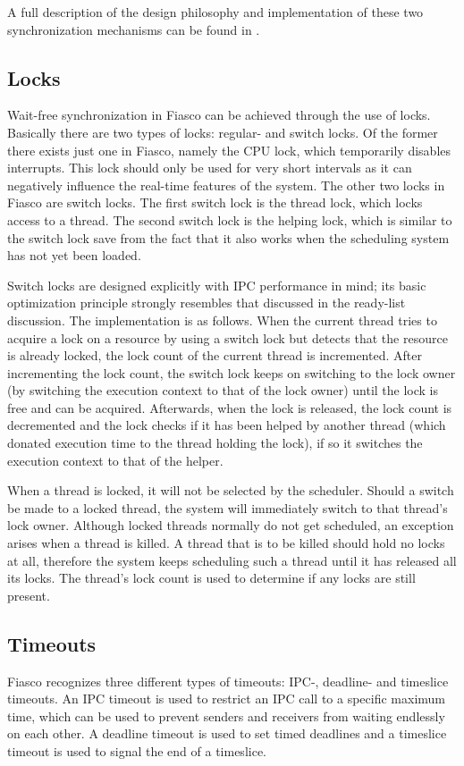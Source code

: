 A full description of the design philosophy and implementation of these two synchronization mechanisms can be found in \cite{hohmuth01pragmatic}.

\subsection{Locks}
Wait-free synchronization in Fiasco can be achieved through the use of locks. Basically there are two types of locks: regular- and switch locks. Of the former there exists just one in Fiasco, namely the CPU lock, which temporarily disables interrupts. This lock should only be used for very short intervals as it can negatively influence the real-time features of the system. The other two locks in Fiasco are switch locks. The first switch lock is the thread lock, which locks access to a thread. The second switch lock is the helping lock, which is similar to the switch lock save from the fact that it also works when the scheduling system has not yet been loaded.\emptyline

Switch locks are designed explicitly with IPC performance in mind; its basic optimization principle strongly resembles that discussed in the ready-list discussion. The implementation is as follows. When the current thread tries to acquire a lock on a resource by using a switch lock but detects that the resource is already locked, the lock count of the current thread is incremented. After incrementing the lock count, the switch lock keeps on switching to the lock owner (by switching the execution context to that of the lock owner) until the lock is free and can be acquired. Afterwards, when the lock is released, the lock count is decremented and the lock checks if it has been helped by another thread (which donated execution time to the thread holding the lock), if so it switches the execution context to that of the helper.\emptyline

When a thread is locked, it will not be selected by the scheduler. Should a switch be made to a locked thread, the system will immediately switch to that thread's lock owner. Although locked threads normally do not get scheduled, an exception arises when a thread is killed. A thread that is to be killed should hold no locks at all, therefore the system keeps scheduling such a thread until it has released all its locks. The thread's lock count is used to determine if any locks are still present.

\subsection{Timeouts}
Fiasco recognizes three different types of timeouts: IPC-, deadline- and timeslice timeouts. An IPC timeout is used to restrict an IPC call to a specific maximum time, which can be used to prevent senders and receivers from waiting endlessly on each other. A deadline timeout is used to set timed deadlines and a timeslice timeout is used to signal the end of a timeslice.\emptyline

